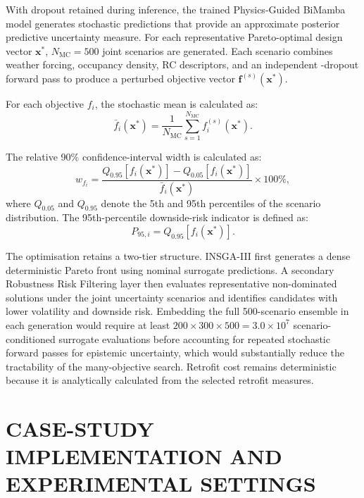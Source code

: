 \documentclass[11pt]{article}
\providecommand{\MC}{\text{MC}}
\begin{document}
With dropout retained during inference, the trained Physics-Guided BiMamba model generates stochastic predictions that provide an approximate posterior predictive uncertainty measure. For each representative Pareto-optimal design vector $\mathbf{x}^{*}$, $N_{\mathrm{MC}}=500$ joint scenarios are generated. Each scenario combines weather forcing, occupancy density, RC descriptors, and an independent \MC-dropout forward pass to produce a perturbed objective vector $\mathbf{f}^{(s)}(\mathbf{x}^{*})$.

For each objective $f_i$, the stochastic mean is calculated as:
\begin{equation}
\bar{f}_{i}(\mathbf{x}^{*})=
\frac{1}{N_{\mathrm{MC}}}
\sum_{s=1}^{N_{\mathrm{MC}}}
f_{i}^{(s)}(\mathbf{x}^{*}).
\end{equation}

The relative 90\% confidence-interval width is calculated as:
\begin{equation}
w_{f_i}=
\frac{
Q_{0.95}\left[f_i(\mathbf{x}^{*})\right]
-
Q_{0.05}\left[f_i(\mathbf{x}^{*})\right]
}
{\bar{f}_{i}(\mathbf{x}^{*})}
\times100\%,
\end{equation}
where $Q_{0.05}$ and $Q_{0.95}$ denote the 5th and 95th percentiles of the scenario distribution. The 95th-percentile downside-risk indicator is defined as:
\begin{equation}
P_{95,i}=
Q_{0.95}\left[f_i(\mathbf{x}^{*})\right].
\end{equation}

The optimisation retains a two-tier structure. INSGA-III first generates a dense deterministic Pareto front using nominal surrogate predictions. A secondary Robustness Risk Filtering layer then evaluates representative non-dominated solutions under the joint uncertainty scenarios and identifies candidates with lower volatility and downside risk. Embedding the full 500-scenario ensemble in each generation would require at least $200\times300\times500=3.0\times10^{7}$ scenario-conditioned surrogate evaluations before accounting for repeated stochastic forward passes for epistemic uncertainty, which would substantially reduce the tractability of the many-objective search. Retrofit cost remains deterministic because it is analytically calculated from the selected retrofit measures.

\section{CASE-STUDY IMPLEMENTATION AND EXPERIMENTAL SETTINGS}
\end{document}

